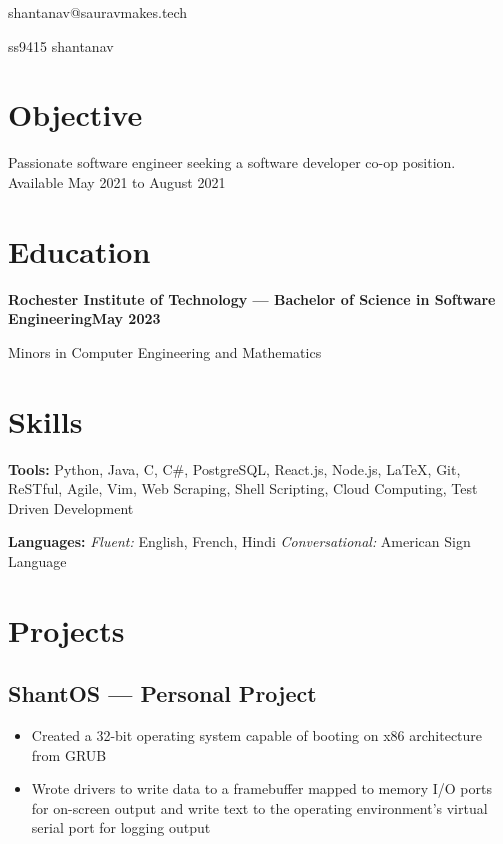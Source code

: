 \documentclass[11pt, letterpaper]{article}
\makeatletter
\renewcommand{\maketitle} {
    \thispagestyle{empty}
    \begin{center}    
        {\huge\bfseries \theauthor}

        {\large shantanav@sauravmakes.tech}

        \faGithub \hspace{4px} {\large ss9415} \hspace{10px} \faLinkedin \hspace{4px} {\large shantanav}

    \end{center}
}
\makeatother
\begin{document}
    \author{Shantanav Saurav}
    \maketitle

    \section{Objective}
        Passionate software engineer seeking a software developer co-op position. Available
        May 2021 to August 2021
    \section{Education}
        \textbf{Rochester Institute of Technology --- 
        Bachelor of Science in Software Engineering\hfill May 2023} 
        
        \hspace{204px} Minors in Computer Engineering and Mathematics

    \section{Skills}
        \textbf{Tools:}
            Python, Java, C, C\#, PostgreSQL, React.js, Node.js, LaTeX, Git, ReSTful, Agile, Vim,
            Web Scraping, Shell Scripting, Cloud Computing, Test Driven Development

        \textbf{Languages:} \hspace{0px}
            \emph{Fluent:} English, French, Hindi \hspace{4px}
            \emph{Conversational:} American Sign Language

    \section{Projects}
        \subsection{ShantOS --- Personal Project}
            \begin{itemize}[nosep]
                \item Created a 32-bit operating system capable of booting on x86 architecture from GRUB 
                \item Wrote drivers to write data to a framebuffer mapped to memory I/O ports for 
                    on-screen output and write text to the operating environment's virtual serial 
                    port for logging output 
            \end{itemize}
\end{document}
